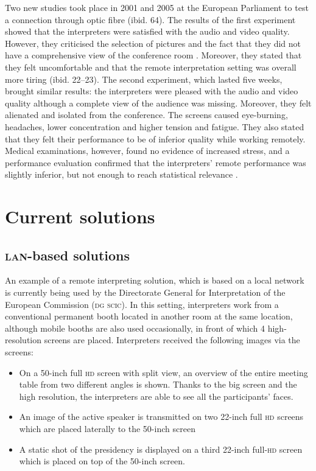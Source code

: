 \documentclass[output=paper]{langsci/langscibook}
\begin{document}
Two new studies took place in 2001 and 2005 at the European Parliament to test a connection through optic fibre (ibid. 64). The results of the first experiment showed that the interpreters were satisfied with the audio and video quality. However, they criticised the selection of pictures and the fact that they did not have a comprehensive view of the conference room \citep[19--21]{Europarl2001}. Moreover, they stated that they felt uncomfortable and that the remote interpretation setting was overall more tiring (ibid. 22--23). The second experiment, which lasted five weeks, brought similar results: the interpreters were pleased with the audio and video quality although a complete view of the audience was missing. Moreover, they felt alienated and isolated from the conference. The screens caused eye-burning, headaches, lower concentration and higher tension and fatigue. They also stated that they felt their performance to be of inferior quality while working remotely. Medical examinations, however, found no evidence of increased stress, and a performance evaluation confirmed that the interpreters’ remote performance was slightly inferior, but not enough to reach statistical relevance \citep[225--243]{Roziner2010}.

\section{Current solutions}
\label{sec:ziegler:04}
\subsection{\textsc{lan}-based solutions} 
\label{sub:ziegler:4.1}
An example of a remote interpreting solution, which is based on a local network is currently being used by the Directorate General for Interpretation of the European Commission (\textsc{dg scic}). In this setting, interpreters work from a conventional permanent booth located in another room at the same location, although mobile booths are also used occasionally, in front of which 4 high-resolution screens are placed. Interpreters received the following images via the screens:

\begin{itemize}
\item On a 50-inch full \textsc{hd} screen with split view, an overview of the entire meeting table from two different angles is shown. Thanks to the big screen and the high resolution, the interpreters are able to see all the participants’ faces.
\item An image of the active speaker is transmitted on two 22-inch full \textsc{hd} screens which are placed laterally to the 50-inch screen
\item A static shot of the presidency is displayed on a third 22-inch full-\textsc{hd} screen which is placed on top of the 50-inch screen.
\end{itemize}
\end{document}
